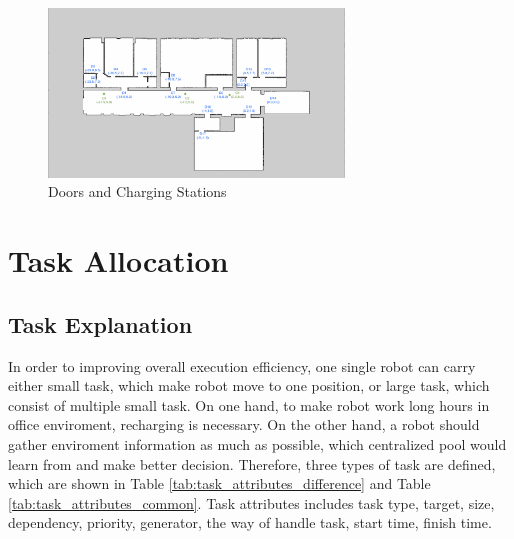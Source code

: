 \begin{figure}[htbp]
	\centering
	\includegraphics[width = 0.7\textwidth]{content/images/ch3/positions_door_station.png}
	\caption{Doors and Charging Stations}
	\label{fig:positions_door_station}
\end{figure}

\section{Task Allocation}

\subsection{Task Explanation}
\label{sec:task_explanation}
In order to improving overall execution efficiency, one single robot can carry either small task, which make robot move to one position, or large task, which consist of multiple small task.
On one hand, to make robot work long hours in office enviroment, recharging is necessary. On the other hand, a robot should gather enviroment information as much as possible, which centralized pool would learn from and make better decision. 
Therefore, three types of task are defined, which are shown in Table \ref{tab:task_attributes_difference} and Table \ref{tab:task_attributes_common}.  Task attributes includes task type, target, size, dependency, priority, generator, the way of handle task, start time, finish time.

\begin{table}[htb]
\centering
{}
\caption{Task arributes part 1}
\label{tab:task_attributes_difference}
\end{table}

